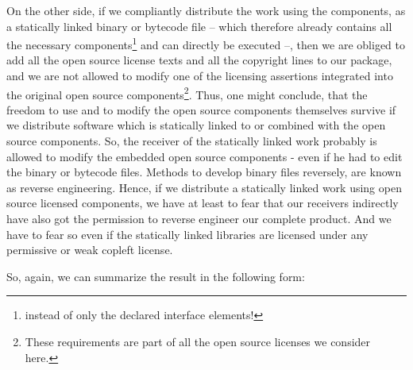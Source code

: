 On the other side, if we compliantly distribute the work using the components,
as a statically linked binary or bytecode file -- which therefore already
contains all the necessary components\footnote{instead of only the declared
interface elements!} and can directly be executed --, then we are obliged to add
all the open source license texts and all the copyright lines to our package,
and we are not allowed to modify one of the licensing assertions integrated into
the original open source components\footnote{These requirements are part of all
the open source licenses we consider here.}. Thus, one might conclude, that the
freedom to use and to modify the open source components themselves survive if we
distribute software which is statically linked to or combined with the open
source components. So, the receiver of the statically linked work probably is
allowed to modify the embedded open source components - even if he had to edit
the binary or bytecode files. Methods to develop binary files reversely, are
known as reverse engineering. Hence, if we distribute a statically linked work
using open source licensed components, we have at least to fear that our
receivers indirectly have also got the permission to reverse engineer our
complete product. And we have to fear so even if the statically linked libraries
are licensed under any permissive or weak copleft license.

So, again, we can summarize the result in the following form:

